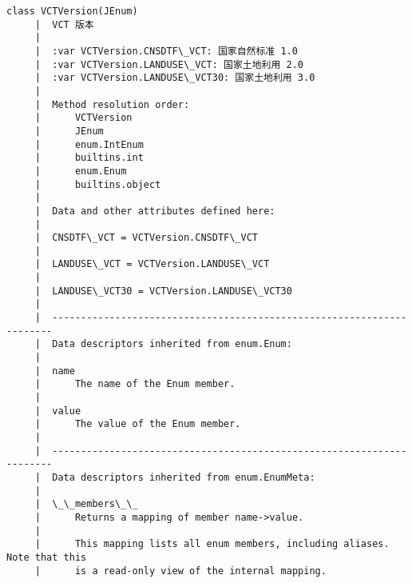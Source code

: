 \documentclass[11pt]{article}
\begin{document}
\begin{Verbatim}[commandchars=\\\{\}]
    class VCTVersion(JEnum)
     |  VCT 版本
     |  
     |  :var VCTVersion.CNSDTF\_VCT: 国家自然标准 1.0
     |  :var VCTVersion.LANDUSE\_VCT: 国家土地利用 2.0
     |  :var VCTVersion.LANDUSE\_VCT30: 国家土地利用 3.0
     |  
     |  Method resolution order:
     |      VCTVersion
     |      JEnum
     |      enum.IntEnum
     |      builtins.int
     |      enum.Enum
     |      builtins.object
     |  
     |  Data and other attributes defined here:
     |  
     |  CNSDTF\_VCT = VCTVersion.CNSDTF\_VCT
     |  
     |  LANDUSE\_VCT = VCTVersion.LANDUSE\_VCT
     |  
     |  LANDUSE\_VCT30 = VCTVersion.LANDUSE\_VCT30
     |  
     |  ----------------------------------------------------------------------
     |  Data descriptors inherited from enum.Enum:
     |  
     |  name
     |      The name of the Enum member.
     |  
     |  value
     |      The value of the Enum member.
     |  
     |  ----------------------------------------------------------------------
     |  Data descriptors inherited from enum.EnumMeta:
     |  
     |  \_\_members\_\_
     |      Returns a mapping of member name->value.
     |      
     |      This mapping lists all enum members, including aliases. Note that this
     |      is a read-only view of the internal mapping.
    

\end{Verbatim}
\end{document}
